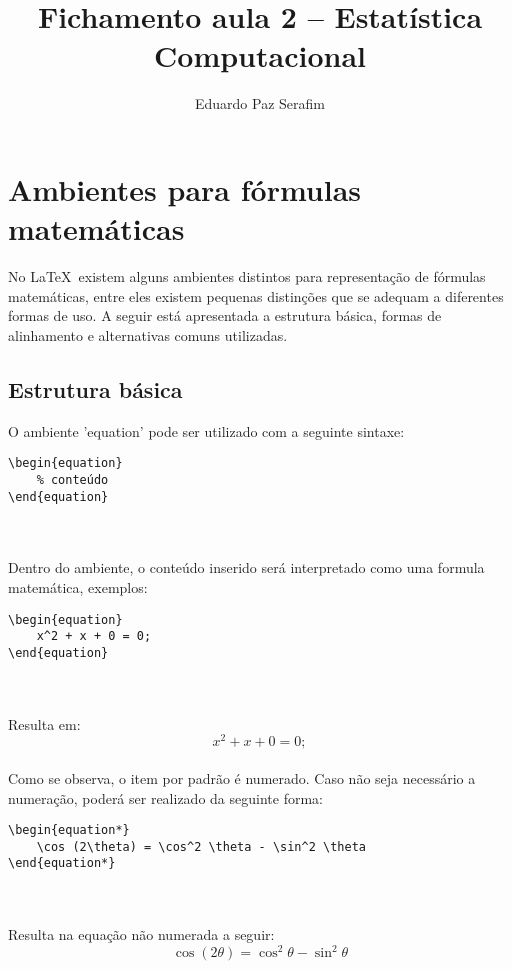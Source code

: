 \documentclass[12pt,a4paper]{article}
\title{Fichamento aula 2 -- Estatística Computacional}
\author{Eduardo Paz Serafim}
\date{}
\begin{document}
	
\maketitle	

\section{Ambientes para fórmulas matemáticas}
No \LaTeX\ existem alguns ambientes distintos para representação de fórmulas matemáticas, entre eles existem pequenas distinções que se adequam a diferentes formas de uso. A seguir está apresentada a estrutura básica, formas de alinhamento e alternativas comuns utilizadas.
\subsection{Estrutura básica}
O ambiente 'equation' pode ser utilizado com a seguinte sintaxe: 

\begin{BVerbatim}
\begin{equation}
\end{equation}
\end{BVerbatim}
\\
\\
Dentro do ambiente, o conteúdo inserido será interpretado como uma formula matemática, exemplos:

\begin{BVerbatim}
\begin{equation}
	x^2 + x + 0 = 0;
\end{equation}
\end{BVerbatim}
\\
\\
Resulta em:
\begin{equation}
	x^2 + x + 0 = 0;
\end{equation}
\\
Como se observa, o item por padrão é numerado. Caso não seja necessário a numeração, poderá ser realizado da seguinte forma:

\begin{BVerbatim}
\begin{equation*}
	\cos (2\theta) = \cos^2 \theta - \sin^2 \theta
\end{equation*}
\end{BVerbatim}
\\
\\
Resulta na equação não  numerada a seguir:
\begin{equation*}
	\cos (2\theta) = \cos^2 \theta - \sin^2 \theta
\end{equation*}
\end{document}
